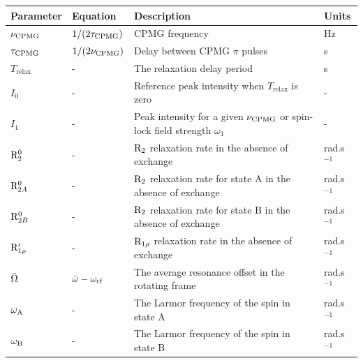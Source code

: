 \begin{table}
\begin{center}
\caption{The parameters of relaxation dispersion.}
\begin{longtable}{llll}
\toprule
Parameter          & Equation                       & Description                                                                   & Units \\
\midrule
$\nu_\textrm{CPMG}$          & $1 / (2 \tau_\textrm{CPMG})$             & CPMG frequency                                                                & Hz \\
$\tau_\textrm{CPMG}$         & $1 / (2 \nu_\textrm{CPMG})$              & Delay between CPMG $\pi$ pulses                                               & s \\
$T_\textrm{relax}$ & -                              & The relaxation delay period                                                   & s \\
$I_0$              & -                              & Reference peak intensity when $T_\textrm{relax}$ is zero                      & - \\
$I_1$              & -                              & Peak intensity for a given $\nu_\textrm{CPMG}$ or spin-lock field strength $\omega_1$   & - \\
$\mathrm{R}_2^0$        & -                              & $\mathrm{R}_2$ relaxation rate in the absence of exchange                            & rad.s$^{-1}$ \\
$\mathrm{R}_{2A}^0$       & -                              & $\mathrm{R}_2$ relaxation rate for state A in the absence of exchange                & rad.s$^{-1}$ \\
$\mathrm{R}_{2B}^0$       & -                              & $\mathrm{R}_2$ relaxation rate for state B in the absence of exchange                & rad.s$^{-1}$ \\
$\mathrm{R}_{1\rho}'$    & -                              & $\mathrm{R}_{1\rho}$ relaxation rate in the absence of exchange                         & rad.s$^{-1}$ \\
$\bar\Omega$       & $\bar\omega - \omega_\textrm{rf}$         & The average resonance offset in the rotating frame                            & rad.s$^{-1}$ \\
$\omega_\textrm{A}$          & -                              & The Larmor frequency of the spin in state A                                   & rad.s$^{-1}$ \\
$\omega_\textrm{B}$          & -                              & The Larmor frequency of the spin in state B                                   & rad.s$^{-1}$ \\

\end{longtable}
\end{center}
\end{table}
